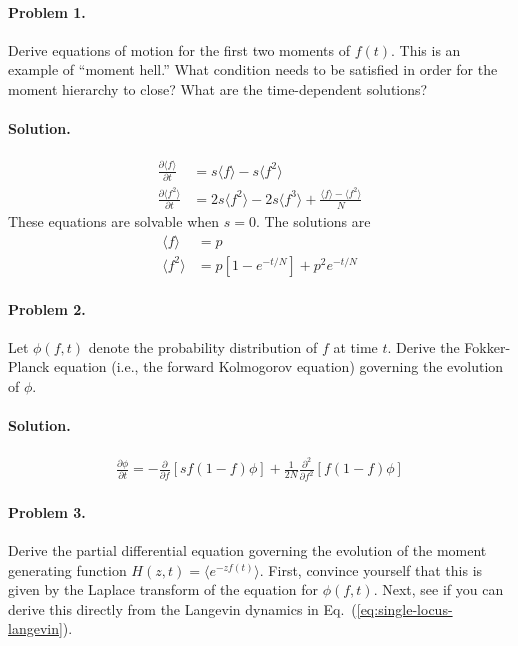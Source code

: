 \documentclass[11pt]{article}
\newcommand{\eq}[1]{Eq.~(\ref{#1})}
\begin{document}
\paragraph{Problem 1.} Derive equations of motion for the first two moments of $f(t)$. This is an example of ``moment hell.'' What condition needs to be satisfied in order for the moment hierarchy to close? What are the time-dependent solutions?

\paragraph{Solution.}
\begin{subequations}
\begin{align}
\frac{\partial \langle f \rangle}{\partial t} & = s \langle f \rangle - s \langle f^2 \rangle \\
\frac{\partial \langle f^2 \rangle}{\partial t} & = 2 s \langle f^2 \rangle - 2 s \langle f^3 \rangle + \frac{\langle f \rangle-\langle f^2 \rangle}{N} 
\end{align}
\end{subequations} 
These equations are solvable when $s=0$. The solutions are
\begin{subequations}
\begin{align}
\langle f \rangle & = p \\
\langle f^2 \rangle & = p \left[ 1 - e^{-t/N} \right] + p^2 e^{-t/N} 
\end{align}
\end{subequations}

\paragraph{Problem 2.} Let $\phi(f,t)$ denote the probability distribution of $f$ at time $t$. Derive the Fokker-Planck equation (i.e., the forward Kolmogorov equation) governing the evolution of $\phi$. 

\paragraph{Solution.} 
\begin{align}
\frac{\partial \phi}{\partial t} = - \frac{\partial}{\partial f} \left[ s f(1-f) \phi \right] + \frac{1}{2N} \frac{\partial^2}{\partial f^2} \left[ f(1-f) \phi \right]
\end{align}

\paragraph{Problem 3.} Derive the partial differential equation governing the evolution of the moment generating function $H(z,t) = \langle e^{-zf(t)} \rangle$. First, convince yourself that this is given by the Laplace transform of the equation for $\phi(f,t)$. Next, see if you can derive this directly from the Langevin dynamics in \eq{eq:single-locus-langevin}. 
\end{document}
